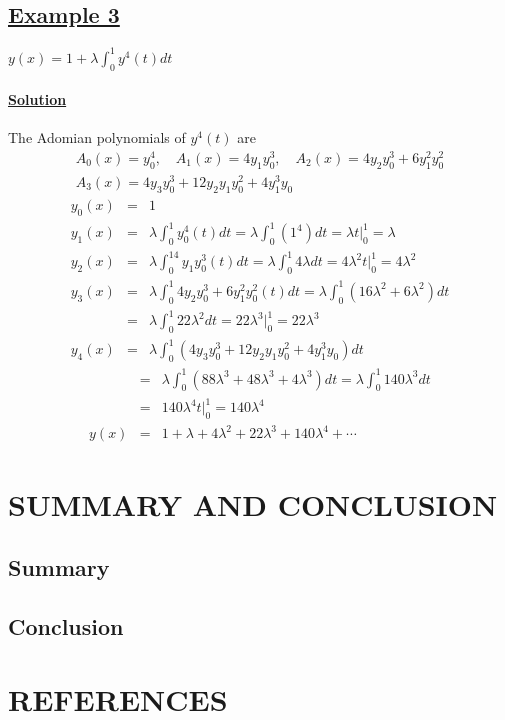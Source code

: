 \documentclass[11pt]{report}
\newcommand{\ubt}[1]{\textbf{\underline{#1}}}
\newcommand{\sps}{\\[0.2cm]}
\newcommand{\dsp}{\displaystyle}
\newcommand{\example}[1]{\section*{\ubt{Example #1}}}
\newcommand{\solution}{\subsubsection{\ubt{Solution}}}
\begin{document}
	\example{3}
	$\dsp y(x) = 1 + \lambda\int_0^1 y^4(t)dt$
	\solution
	The Adomian polynomials of $y^4(t)$ are 
	\begin{gather*}
		A_0(x) = y_0^4,\quad A_1(x) = 4y_1y_0^3,\quad A_2(x) = 4y_2y_0^3 + 6y_1^2y_0^2\sps
		A_3(x) = 4y_3y_0^3 + 12y_2y_1y_0^2 + 4y_1^3y_0
	\end{gather*}
	\begin{eqnarray*}
		y_0(x) &=& 1\sps
		y_1(x) &=& \lambda\int_0^1y_0^4(t)dt = \lambda\int_0^1(1^4)dt = \lambda t\Bigg|_0^1 = \lambda\sps
		y_2(x) &=& \lambda\int_0^14y_1y_0^3(t) dt = \lambda\int_0^1 4\lambda dt = 4\lambda^2 t\Bigg|_0^1 = 4\lambda^2\sps
		y_3(x) &=& \lambda\int_0^1 4y_2y_0^3 + 6y_1^2y_0^2(t)dt =\lambda\int_0^1(16\lambda^2 + 6\lambda^2)dt\sps
		&=& \lambda\int_0^1 22\lambda^2 dt = 22\lambda^3\Bigg|_0^1 = 22\lambda^3\sps
		y_4(x) &=& \lambda\int_0^1(4y_3y_0^3+12y_2y_1y_0^2 + 4y_1^3y_0)dt
	\end{eqnarray*}
	\begin{eqnarray*}
		&=& \lambda\int_0^1(88\lambda^3 + 48\lambda^3 + 4\lambda^3)dt = \lambda\int_0^1 140\lambda^3 dt\sps
		&=& 140\lambda^4 t\Bigg|_0^1 = 140\lambda^4\sps
		y(x) &=& 1 + \lambda + 4\lambda^2 + 22\lambda^3 + 140\lambda^4 + \cdots
	\end{eqnarray*}

	\chapter{SUMMARY AND CONCLUSION}
	\section{Summary}
	
	
	\section{Conclusion}
	
	
	
	
	\chapter*{REFERENCES}
	
	\begin{description}
		\item 
	\end{description}
	
\end{document}
